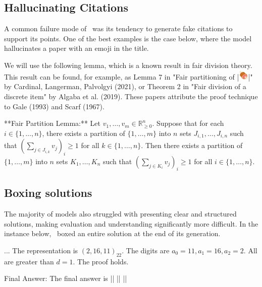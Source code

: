\subsection{Hallucinating Citations}
\label{app:hallucinations}

A common failure mode of \geminipro{}~was its tendency to generate fake citations to support its points. One of the best examples is the case below, where the model hallucinates a paper with an emoji in the title.

\begin{geminilsescaped}{\geminiproheader}
    We will use the following lemma, which is a known result in fair division theory. This result can be found, for example, as Lemma 7 in "Fair partitioning of |\includegraphics[height=1.3em]{figures/meat-on-bone.png}|" by Cardinal, Langerman, Palvolgyi (2021), or Theorem 2 in "Fair division of a discrete item" by Algaba et al. (2019). These papers attribute the proof technique to Gale (1993) and Scarf (1967).
    
    **Fair Partition Lemma:** Let $v_1, \dots, v_m \in \mathbb{R}^n_{\ge 0}$. Suppose that for each $i \in \{1, \dots, n\}$, there exists a partition of $\{1, \dots, m\}$ into $n$ sets $J_{i,1}, \dots, J_{i,n}$ such that $(\sum_{j \in J_{i,k}} v_j)_i \ge 1$ for all $k \in \{1, \dots, n\}$. Then there exists a partition of $\{1, \dots, m\}$ into $n$ sets $K_1, \dots, K_n$ such that $(\sum_{j \in K_i} v_j)_i \ge 1$ for all $i \in \{1, \dots, n\}$.
    \end{geminilsescaped}


\subsection{Boxing solutions}
\label{app:boxing_solutions}

The majority of models also struggled with presenting clear and structured solutions, making evaluation and understanding significantly more difficult. In the instance below, \geminipro{}~boxed an entire solution at the end of its generation.

\begin{geminilsescaped}{\geminiproheader}
...
The representation is $(2, 16, 11)_{22}$. The digits are $a_0=11, a_1=16, a_2=2$. All are greater than $d=1$. The proof holds.

Final Answer: The final answer is ||
||
||
\end{geminilsescaped}